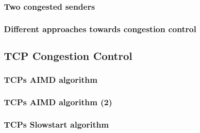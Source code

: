     \subsubsection*{Two congested senders}
    \subsubsection*{Different approaches towards congestion control}

\subsection*{TCP Congestion Control}
    \subsubsection*{TCPs AIMD algorithm}
    \subsubsection*{TCPs AIMD algorithm (2)}
    \subsubsection*{TCPs Slowstart algorithm}